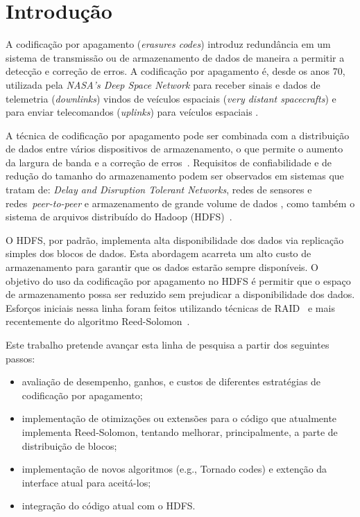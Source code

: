 \chapter{Introdução}

A codificação por apagamento (\emph{erasures codes}) introduz
redundância em um sistema de transmissão ou de armazenamento de dados de
maneira a permitir a detecção e correção de erros. A codificação por
apagamento é, desde os anos 70, utilizada pela \emph{NASA's Deep Space
  Network} para receber sinais e dados de telemetria
(\emph{downlinks}) vindos de veículos espaciais (\emph{very distant
  spacecrafts}) e para enviar telecomandos (\emph{uplinks}) para
veículos espaciais \cite{Almeida:2007, STO:2010, TDD:2010}.

A técnica de codificação por apagamento pode ser combinada com a
distribuição de dados entre vários dispositivos de armazenamento, o
que permite o aumento da largura de banda e a correção de
erros~\cite{Woitaszek:2007, Plank:1997}. Requisitos de confiabilidade
e de redução do tamanho do armazenamento podem ser observados em
sistemas que tratam de: 
\emph{Delay and Disruption Tolerant Networks}, redes de sensores e
redes~\emph{peer-to-peer} \cite{Bhagwan:2004, Haeberlen:2005,
Rodrigues:2005, RTAD:2007, Wilcox-O'Hearn:2008, Houri:2009} e
armazenamento de grande volume de dados \cite{Anderson:1998,
Kubiatowicz:2000, Schmuck:2002, Saito:2004, Xia:2006, Storer:2008,
Storer:2009}, como também o sistema de arquivos distribuído do
Hadoop (HDFS)~\cite{HDFS-503:2010}.

O HDFS, por padrão, implementa alta disponibilidade dos dados via
replicação simples dos blocos de dados. Esta abordagem acarreta um
alto custo de armazenamento para garantir que os dados estarão sempre
disponíveis. O objetivo do uso da codificação por apagamento no HDFS é
permitir que o espaço de armazenamento possa ser reduzido sem
prejudicar a disponibilidade dos dados. Esforços iniciais nessa linha
foram feitos utilizando técnicas de RAID~\cite{HDFS-503:2010} e mais
recentemente do algoritmo Reed-Solomon~\cite{MR-1969:2010}.

Este trabalho pretende avançar esta linha de pesquisa a partir dos
seguintes passos:

\begin{itemize}
\item avaliação de desempenho, ganhos, e custos de diferentes
  estratégias de codificação por apagamento;

\item implementação de otimizações ou extensões para o código que
  atualmente implementa Reed-Solomon, tentando melhorar,
  principalmente, a parte de distribuição de blocos;

\item implementação de novos algoritmos (e.g., Tornado codes) e
  extenção da interface atual para aceitá-los;

\item integração do código atual com o HDFS.

\end{itemize}

